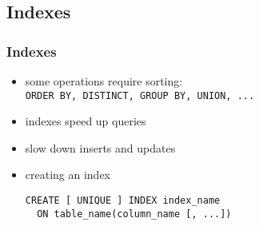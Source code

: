 \documentclass[dvipsnames]{beamer}
\theoremstyle{plain}
\begin{document}
\subsection{Indexes}

\begin{frame}[fragile]
  \frametitle{Indexes}

  \begin{itemize}
    \item some operations require sorting:\\
      \lstinline!ORDER BY, DISTINCT, GROUP BY, UNION, ...!

    \medskip
    \item indexes speed up queries
    \item slow down inserts and updates

    \pause
    \bigskip
    \item creating an index
    \begin{lstlisting}
CREATE [ UNIQUE ] INDEX index_name
  ON table_name(column_name [, ...])
    \end{lstlisting}
  \end{itemize}
\end{frame}
%
%
%
%
%
%
%
%
%
\end{document}
